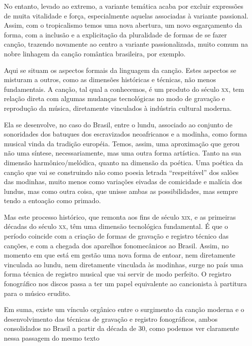 No entanto, levado ao extremo, a variante temática acaba por excluir
expressões de muita vitalidade e força, especialmente aquelas associadas
à variante passional. Assim, com o tropicalismo temos uma nova abertura,
um novo esgarçamento da forma, com a inclusão e a explicitação da
pluralidade de formas de se fazer canção, trazendo novamente ao centro a
variante passionalizada, muito comum na nobre linhagem da canção
romântica brasileira, por exemplo.

Aqui se situam os aspectos formais da linguagem da canção. Estes
aspectos se misturam a outros, como as dimensões históricas e técnicas,
não menos fundamentais. A canção, tal qual a conhecemos, é um produto do
século \textsc{xx}, tem relação direta com algumas mudanças tecnológicas no modo
de gravação e reprodução da música, diretamente vinculados à indústria
cultural moderna.

Ela se desenvolve, no caso do Brasil, entre o lundu, associado ao
conjunto de sonoridades dos batuques dos escravizados neoafricanos e a
modinha, como forma musical vinda da tradição européia. Temos, assim,
uma aproximação que gerou não uma síntese, necessariamente, mas uma
outra forma artística. Tanto na sua dimensão harmônico/melódica, quanto
na dimensão da poética. Uma poética da canção que vai se construindo não
como poesia letrada ``respeitável'' dos salões das modinhas, muito menos
como variações eivadas de comicidade e malícia dos lundus, mas como
outra coisa, que unisse ambas as possibilidades, mas sempre tendo a
entoação como primado.

Mas este processo histórico, que remonta aos fins de século \textsc{xix}, e as
primeiras décadas do século \textsc{xx}, têm uma dimensão tecnológica
fundamental. É que o período coincide com a criação de formas de
gravação e registro técnico das canções, e com a chegada dos aparelhos
fonomecânicos ao Brasil. Assim, no momento em que está em gestão uma
nova forma de entoar, nem diretamente vinculada ao lundu, nem
diretamente vinculada às modinhas, surge no país uma forma técnica de
registro musical que vai servir de modo perfeito. O registro fonográfico
nos discos passa a ter um papel equivalente ao cancionista à partitura
para o músico erudito.

Em suma, existe um vínculo orgânico entre o surgimento da canção moderna
e o desenvolvimento das técnicas de gravação e registro fonográficos,
ambos consolidados no Brasil a partir da década de 30, como podemos ver
claramente nessa passagem do mesmo texto

